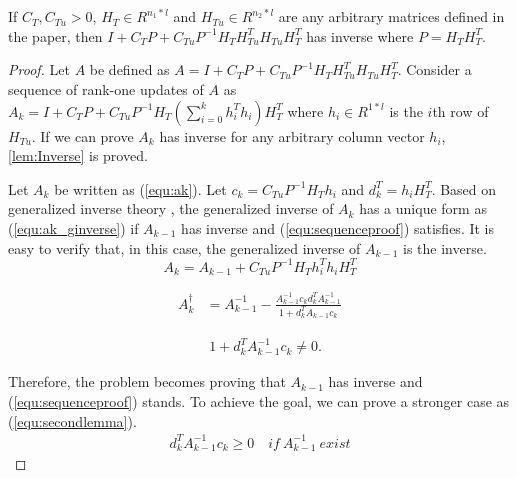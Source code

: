 \documentclass{standalone}
\begin{document}
\thesisappendix

\section{}
\begin{lemma}
\label{lem:Inverse}
If $C_T,C_{Tu}>0$, $H_T \in R^{n_1*l}$ and $H_{Tu} \in R^{n_2 * l}$ are any arbitrary matrices defined in the paper, then $I+C_T P + C_{Tu} P^{-1}H_T H_{Tu}^T H_{Tu} H_T^T$ has inverse where $P=H_T H_T^T$.
\end{lemma}
\begin{proof}
Let $A$ be defined as $A=I+C_T P + C_{Tu} P^{-1}H_T H_{Tu}^T H_{Tu} H_T^T$. Consider a sequence of rank-one updates of $A$ as $A_k=I+C_T P + C_{Tu} P^{-1}H_T (\sum_{i=0}^{k}h_i^T h_i) H_T^T$ where $h_i \in R^{1*l}$ is the $i$th row of $H_{Tu}$. If we can prove $A_k$ has inverse for any arbitrary column vector $h_i$, \ref{lem:Inverse} is proved.

Let $A_k$ be written as (\ref{equ:ak}). Let $c_k=C_{Tu} P^{-1}H_T h_i$ and $d_k^T =h_i H_T^T$. Based on generalized inverse theory \cite{Campbell2009GENERALIZED}, the generalized inverse of $A_k$ has a unique form as (\ref{equ:ak_ginverse}) if $A_{k-1}$ has inverse and (\ref{equ:sequenceproof}) satisfies. It is easy to verify that, in this case, the generalized inverse of $A_{k-1}$ is the inverse. 
\begin{equation}
\label{equ:ak}
A_k=A_{k-1}+C_{Tu} P^{-1}H_T h_i^T h_i H_T^T
\end{equation}

\begin{equation}
\label{equ:ak_ginverse}
\begin{aligned}
A_k^{\dagger}&=A_{k-1}^{-1}-\frac{A_{k-1}^{-1}c_k d_k^T A_{k-1}^{-1}}{1+ d_k^T A_{k-1}c_k} 
\end{aligned}
\end{equation}

\begin{equation}
\label{equ:sequenceproof}
\begin{aligned}
&1+d_k^T A_{k-1}^{-1} c_k \ne 0.
\end{aligned}
\end{equation}

Therefore, the problem becomes proving that $A_{k-1}$ has inverse and (\ref{equ:sequenceproof}) stands. To achieve the goal, we can prove a stronger case as (\ref{equ:secondlemma}). 
\begin{equation}
\label{equ:secondlemma}
\begin{aligned}
d_k^T A_{k-1}^{-1} c_k \ge 0 \quad if \ A_{k-1}^{-1} \  exist
\end{aligned}
\end{equation}


\end{proof}
\end{document}
